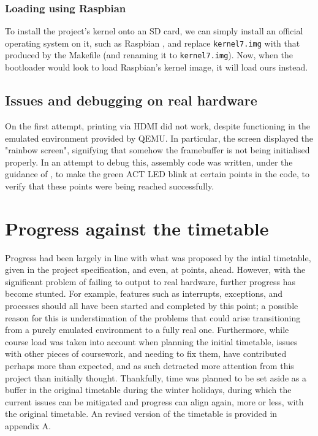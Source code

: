 \documentclass[10pt,a4paper]{article}
\newcommand{\code}[1]{\texttt{#1}}
\begin{document}
\subsubsection{Loading using Raspbian}
To install the project's kernel onto an SD card, we can simply install an
official operating system on it, such as Raspbian \cite{Raspbian}, and replace
\code{kernel7.img} with that produced by the Makefile (and renaming it to
\code{kernel7.img}). Now, when the bootloader would look to load Raspbian's
kernel image, it will load ours instead.

\subsection{Issues and debugging on real hardware}
On the first attempt, printing via HDMI did not work, despite functioning in the
emulated environment provided by QEMU. In particular, the screen displayed the
"rainbow screen", signifying that somehow the framebuffer is not being
initialised properly. In an attempt to debug this, assembly code was written,
under the guidance of \cite{BakingPi}, to make the green ACT LED blink at
certain points in the code, to verify that these points were being reached
successfully.

\section{Progress against the timetable}
Progress had been largely in line with what was proposed by the intial
timetable, given in the project specification, and even, at points, ahead.
However, with the significant problem of failing to output to real hardware,
further progress has become stunted. For example, features such as interrupts,
exceptions, and processes should all have been started and completed by this
point; a possible reason for this is understimation of the problems that could
arise transitioning from a purely emulated environment to a fully real one.
Furthermore, while course load was taken into account when planning the initial
timetable, issues with other pieces of coursework, and needing to fix them, have
contributed perhaps more than expected, and as such detracted more attention
from this project than initially thought. Thankfully, time was planned to be set
aside as a buffer in the original timetable during the winter holidays, during
which the current issues can be mitigated and progress can align again, more or
less, with the original timetable. An revised version of the timetable is
provided in appendix A.
\end{document}
